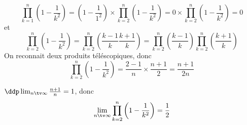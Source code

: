 \begin{correction}
$$\prod_{k=1}^n \left(1-\frac{1}{k^2}\right) = \left(1-\frac{1}{1^2}\right) \times \prod_{k=2}^n \left(1-\frac{1}{k^2}\right) =0 \times \prod_{k=2}^n \left(1-\frac{1}{k^2}\right) =0$$
et
$$\prod_{k=2}^n \left(1-\frac{1}{k^2}\right) =\prod_{k=2}^n\left( \frac{k-1}{k}\frac{k+1}{k}\right) = \prod_{k=2}^n\left( \frac{k-1}{k}\right) \prod_{k=2}^n\left(  \frac{k+1}{k}\right) $$ 
On reconnait deux produits téléscopiques, donc 
$$\prod_{k=2}^n \left(1-\frac{1}{k^2}\right)  = \frac{2-1}{n} \times \frac{n+1}{2} =\frac{n+1}{2n}$$

$\ddp \lim_{n\tv \infty} \frac{n+1}{n}=1$, donc 
$$\lim_{n\tv \infty} \prod_{k=2}^n \left(1-\frac{1}{k^2}\right)  =\frac{1}{2}$$

\end{correction}




